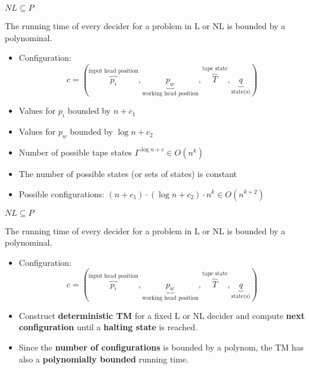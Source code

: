 \begin{frame}{$NL \subseteq P$}

\begin{theorem}
The running time of every decider for a problem in L or NL is bounded by a polynominal.
\end{theorem}

\begin{itemize}
\item Configuration:
    \[
        c = (\overbrace{p_i}^{\text{input head position}}, \underbrace{p_w}_{\text{working head position}}, \overbrace{T}^{\text{tape state}}, \underbrace{q}_{\text{state(s)}})
    \]
\item Values for $p_i$ bounded by $n +c_1$
\item Values for $p_w$ bounded by $\log n + c_2$
\item Number of possible tape states $\Gamma^{\log n + c} \in O(n^k)$
\item The number of possible states (or sets of states) is constant
\item Possible configurations: $(n + c_1) \cdot (\log n + c_2) \cdot n^k \in O(n^{k+2})$
\end{itemize}

\end{frame}

\begin{frame}{$NL \subseteq P$}

\begin{theorem}
The running time of every decider for a problem in L or NL is bounded by a polynominal.
\end{theorem}

\begin{itemize}
\item Configuration:
    \[
        c = (\overbrace{p_i}^{\text{input head position}}, \underbrace{p_w}_{\text{working head position}}, \overbrace{T}^{\text{tape state}}, \underbrace{q}_{\text{state(s)}})
    \]
\item Construct \textbf{deterministic TM} for a fixed L or NL decider and compute \textbf{next configuration} until
        a \textbf{halting state} is reached.
\item Since the \textbf{number of configurations} is bounded by a polynom, the TM has also a \textbf{polynomially bounded} running time.
\end{itemize}

\end{frame}

